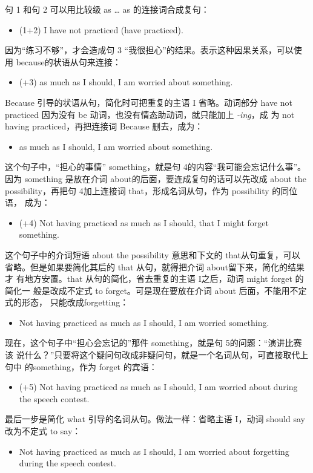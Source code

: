 句 1 和句 2 可以用比较级 as \ldots{} as 的连接词合成复句：
\begin{itemize}
\item (1+2) I have not practiced  (have practiced).
\end{itemize}
因为“练习不够”，才会造成句 3 “我很担心”的结果。表示这种因果关系，可以使
用 because的状语从句来连接：
\begin{itemize}
\item (+3)  as much as I should, I am
  worried about something.
\end{itemize}
Because 引导的状语从句，简化时可把重复的主语 I 省略。动词部分 have not
practiced 因为没有 be 动词，也没有情态助动词，就只能加上 \emph{-ing}，成
为 not having practiced，再把连接词 Because 删去，成为：
\begin{itemize}
\item {} as much as I should, I am worried about something.
\end{itemize}
这个句子中，“担心的事情” something，就是句 4的内容“我可能会忘记什么事”。
因为 something 是放在介词 about的后面，要连成复句的话可以先改成 about the
possibility，再把句 4加上连接词 that，形成名词从句，作为 possibility 的同位语，
成为：
\begin{itemize}
\item (+4) Not having practiced as much as I should,  that I might forget something.
\end{itemize}
这个句子中的介词短语 about the possibility 意思和下文的 that从句重复，可以
省略。但是如果要简化其后的 that 从句，就得把介词 about留下来，简化的结果才
有地方安置。that 从句的简化，省去重复的主语 I之后，动词 might forget 的简化一
般是改成不定式 to forget。可是现在要放在介词 about 后面，不能用不定式的形态，
只能改成forgetting：
\begin{itemize}
\item Not having practiced as much as I should, I am worried 
  something.
\end{itemize}
现在，这个句子中“担心会忘记的”那件 something，就是句 5的问题：“演讲比赛该
说什么？”只要将这个疑问句改成非疑问句，就是一个名词从句，可直接取代上句中
的something，作为 forget 的宾语：
\begin{itemize}
\item (+5) Not having practiced as much as I should, I am worried about
   during the speech contest.
\end{itemize}
最后一步是简化 what 引导的名词从句。做法一样：省略主语 I，动词 should
say 改为不定式 to say：
\begin{itemize}
\item Not having practiced as much as I should, I am worried about forgetting
   during the speech contest.
\end{itemize}

